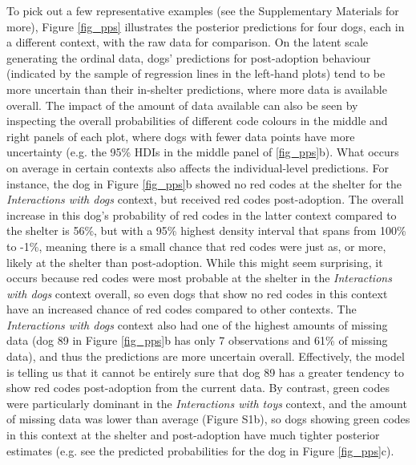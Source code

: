 \documentclass[12pt]{article}
\begin{document}
To pick out a few representative examples (see the Supplementary Materials for more), Figure \ref{fig_pps} illustrates the posterior predictions for four dogs, each in a different context, with the raw data for comparison. On the latent scale generating the ordinal data, dogs' predictions for post-adoption behaviour (indicated by the sample of regression lines in the left-hand plots) tend to be more uncertain than their in-shelter predictions, where more data is available overall. The impact of the amount of data available can also be seen by inspecting the overall probabilities of different code colours in the middle and right panels of each plot, where dogs with fewer data points have more uncertainty (e.g. the 95\% HDIs in the middle panel of \ref{fig_pps}b). What occurs on average in certain contexts also affects the individual-level predictions. For instance, the dog in Figure \ref{fig_pps}b showed no red codes at the shelter for the \textit{Interactions with dogs} context, but received red codes post-adoption. The overall increase in this dog's probability of red codes in the latter context compared to the shelter is 56\%, but with a 95\% highest density interval that spans from 100\% to -1\%, meaning there is a small chance that red codes were just as, or more, likely at the shelter than post-adoption. While this might seem surprising, it occurs because red codes were most probable at the shelter in the \textit{Interactions with dogs} context overall, so even dogs that show no red codes in this context have an increased chance of red codes compared to other contexts. The \textit{Interactions with dogs} context also had one of the highest amounts of missing data (dog 89 in Figure \ref{fig_pps}b has only 7 observations and 61\% of missing data), and thus the predictions are more uncertain overall. Effectively, the model is telling us that it cannot be entirely sure that dog 89 has a greater tendency to show red codes post-adoption from the current data. By contrast, green codes were particularly dominant in the \textit{Interactions with toys} context, and the amount of missing data was lower than average (Figure S1b), so dogs showing green codes in this context at the shelter and post-adoption have much tighter posterior estimates (e.g. see the predicted probabilities for the dog in Figure \ref{fig_pps}c).
\end{document}
